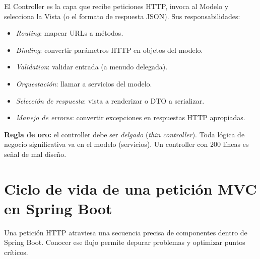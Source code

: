 \documentclass[11pt,a4paper,openany]{book}
\begin{document}
El Controller es la capa que recibe peticiones HTTP, invoca al Modelo
y selecciona la Vista (o el formato de respuesta JSON). Sus
responsabilidades:

\begin{itemize}
\item \emph{Routing}: mapear URLs a métodos.
\item \emph{Binding}: convertir parámetros HTTP en objetos del modelo.
\item \emph{Validation}: validar entrada (a menudo delegada).
\item \emph{Orquestación}: llamar a servicios del modelo.
\item \emph{Selección de respuesta}: vista a renderizar o DTO a
serializar.
\item \emph{Manejo de errores}: convertir excepciones en respuestas
HTTP apropiadas.
\end{itemize}

\textbf{Regla de oro:} el controller debe ser \emph{delgado} (\emph{thin
controller}). Toda lógica de negocio significativa va en el modelo
(servicios). Un controller con 200 líneas es señal de mal diseño.

\section{Ciclo de vida de una petición MVC en Spring Boot}

Una petición HTTP atraviesa una secuencia precisa de
componentes dentro de Spring Boot. Conocer ese flujo permite
depurar problemas y optimizar puntos críticos.
\end{document}

